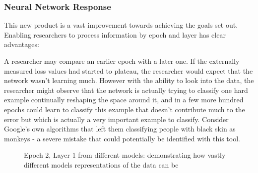 \documentclass[a4paper,11pt,titlepage]{article}
\begin{document}
		\subsubsection{Neural Network Response}
		This new product is a vast improvement towards achieving the goals set out. Enabling researchers to process information by epoch and layer has clear advantages:
		\par 
		A researcher may compare an earlier epoch with a later one. If the externally measured loss values had started to plateau, the researcher would expect that the network wasn't learning much. However with the ability to look into the data, the researcher might observe that the network is actually trying to classify one hard example continually reshaping the space around it, and in a few more hundred epochs could learn to classify this example that doesn't contribute much to the error but which is actually a very important example to classify. Consider Google's own algorithms that left them classifying people with black skin as monkeys - a severe mistake that could potentially be identified with this tool.
		\par 
						
	\begin{figure}[H]
    			\caption{Epoch 2, Layer 1 from different models: demonstrating how vastly different models representations of the data can be}%
	\end{figure}	
	
\end{document}
